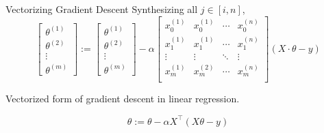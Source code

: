 \documentclass{beamer}
\begin{document}
\begin{frame}{Vectorizing Gradient Descent}
Synthesizing all $j \in [i,n]$,
$$
\begin{bmatrix}
    \theta^{(1)}\\\theta^{(2)}\\\vdots\\\theta^{(m)}
\end{bmatrix}
:=
\begin{bmatrix}
    \theta^{(1)}\\\theta^{(2)}\\\vdots\\\theta^{(m)}
\end{bmatrix}
- \alpha
\begin{bmatrix}
    x_0^{(1)}&x_0^{(1)}&\cdots&x_0^{(n)}\\
    x_1^{(1)}&x_1^{(1)}&\cdots&x_1^{(n)}\\
    \vdots&\vdots&\ddots&\vdots\\
    x_m^{(1)}&x_m^{(2)}&\cdots&x_m^{(n)}\\
\end{bmatrix}
(X\cdot\theta - y)
$$

\begin{theorem}
    Vectorized form of gradient descent in linear regression.
    
    $$\theta := \theta - \alpha X^{\top}(X\theta - y)$$
\end{theorem}
    
\end{frame}


\end{document}
